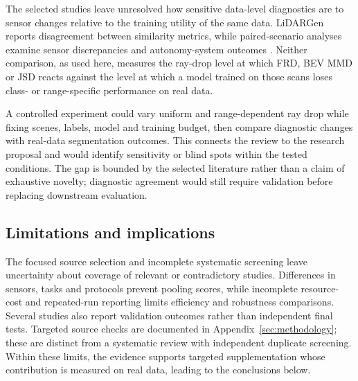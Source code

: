 The selected studies leave unresolved how sensitive data-level diagnostics
are to sensor changes relative to the training utility of the same data.
LiDARGen reports disagreement between similarity metrics, while paired-scenario
analyses examine sensor discrepancies and autonomy-system outcomes
\parencite{zyrianovLearningGenerateRealistic2022,manivasagamZeroDomainGap2023}.
Neither comparison, as used here, measures the ray-drop level at which FRD,
BEV MMD or JSD reacts against the level at which a model trained on those
scans loses class- or range-specific performance on real data.

A controlled experiment could vary uniform and range-dependent ray drop
while fixing scenes, labels, model and training budget, then compare diagnostic
changes with real-data segmentation outcomes. This connects the review to
the research proposal and would identify sensitivity or blind spots within
the tested conditions. The gap is bounded by the selected literature rather
than a claim of exhaustive novelty; diagnostic agreement would still require
validation before replacing downstream evaluation.

\subsection{Limitations and implications}

The focused source selection and incomplete systematic screening leave
uncertainty about coverage of relevant or contradictory studies. Differences
in sensors, tasks and protocols prevent pooling scores, while incomplete
resource-cost and repeated-run reporting limits efficiency and robustness
comparisons. Several studies also report validation outcomes rather than
independent final tests. Targeted source checks are documented in Appendix~\ref{sec:methodology};
these are distinct from a systematic review with independent duplicate screening.
Within these limits, the evidence supports targeted supplementation whose
contribution is measured on real data, leading to the conclusions below.
